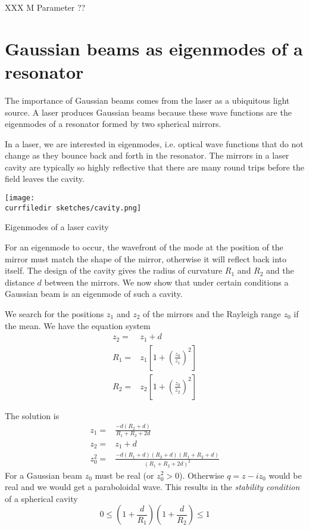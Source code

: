XXX M Parameter ??


\section{Gaussian beams as eigenmodes of a resonator}
The importance of Gaussian beams comes from the laser as a ubiquitous light source. A laser produces Gaussian beams because these wave functions are the eigenmodes of a resonator formed by two spherical mirrors.

In a laser, we are interested in eigenmodes, i.e. optical wave functions that do not change as they bounce back and forth in the resonator. The mirrors in a laser cavity are typically so highly reflective that there are many round trips before the field leaves the cavity.


\begin{marginfigure}
    \texttt{[image: \\currfiledir sketches/cavity.png]}
   \caption{Eigenmodes of a laser cavity}
\end{marginfigure}


For an eigenmode to occur, the wavefront of the mode at the position of the mirror must match the shape of the mirror, otherwise it will reflect back into itself. The design of the cavity gives the radius of curvature $R_1$ and $R_2$ and the distance $d$ between the mirrors. We now show that under certain conditions a Gaussian beam is an eigenmode of such a cavity.

We search for the positions $z_1$ and $z_2$ of the mirrors and the Rayleigh range $z_0$ if the mean. We have the equation system
\begin{align}
    z_2 = & z_1 + d \\
    R_1 = & z_1 \left[ 1 + \left( \frac{z_0}{z_1} \right)^2 \right] \\
    R_2 = & z_2 \left[ 1 + \left( \frac{z_0}{z_2} \right)^2 \right] 
\end{align}

The solution is
\begin{align}
    z_1 = & \frac{-d (R_2 + d)}{R_1 + R_2 + 2d} \\
    z_2 = &z_1 + d  \\
    z_0^2 = & \frac{-d (R_1 +d)(R_2 + d)(R_1 + R_2 +d)}{(R_1 + R_2 + 2d)^2}
\end{align}
For a Gaussian beam $z_0$ must be real (or $z_0^2 > 0$). Otherwise $q = z - i z_0$ would be real and we would get a paraboloidal wave. This results in the \emph{stability condition} of a spherical cavity
\begin{equation}
    0 \le \left( 1 + \frac{d}{R_1} \right) \left( 1 + \frac{d}{R_2} \right) \le 1
\end{equation}

